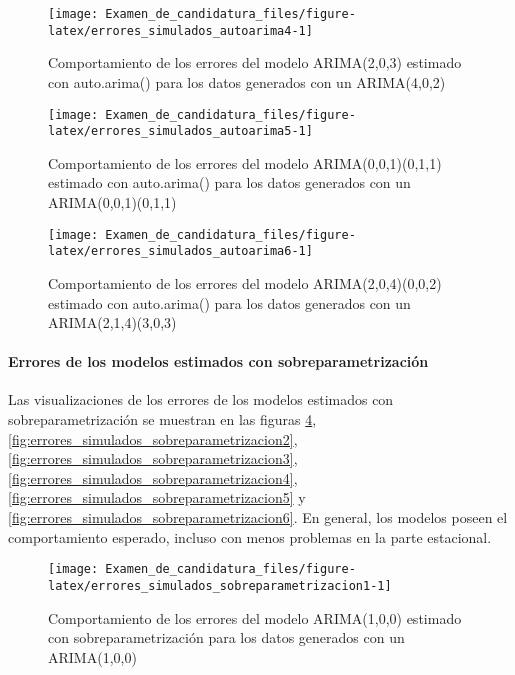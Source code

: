 \documentclass[
]{article}
\begin{document}
\begin{figure}[H]
\texttt{[image: Examen\_de\_candidatura\_files/figure-latex/errores\_simulados\_autoarima4-1]} \caption{Comportamiento de los errores del modelo ARIMA(2,0,3) estimado con auto.arima() para los datos generados con un ARIMA(4,0,2)}\label{fig:errores_simulados_autoarima4}
\end{figure}

\begin{figure}[H]
\texttt{[image: Examen\_de\_candidatura\_files/figure-latex/errores\_simulados\_autoarima5-1]} \caption{Comportamiento de los errores del modelo ARIMA(0,0,1)(0,1,1) estimado con auto.arima() para los datos generados con un ARIMA(0,0,1)(0,1,1)}\label{fig:errores_simulados_autoarima5}
\end{figure}

\begin{figure}[H]
\texttt{[image: Examen\_de\_candidatura\_files/figure-latex/errores\_simulados\_autoarima6-1]} \caption{Comportamiento de los errores del modelo ARIMA(2,0,4)(0,0,2) estimado con auto.arima() para los datos generados con un ARIMA(2,1,4)(3,0,3)}\label{fig:errores_simulados_autoarima6}
\end{figure}

\paragraph{Errores de los modelos estimados con sobreparametrización}

Las visualizaciones de los errores de los modelos estimados con
sobreparametrización se muestran en las figuras
\ref{fig:errores_simulados_sobreparametrizacion1},
\ref{fig:errores_simulados_sobreparametrizacion2},
\ref{fig:errores_simulados_sobreparametrizacion3},
\ref{fig:errores_simulados_sobreparametrizacion4},
\ref{fig:errores_simulados_sobreparametrizacion5} y
\ref{fig:errores_simulados_sobreparametrizacion6}. En general, los
modelos poseen el comportamiento esperado, incluso con menos problemas
en la parte estacional.

\begin{figure}[H]
\texttt{[image: Examen\_de\_candidatura\_files/figure-latex/errores\_simulados\_sobreparametrizacion1-1]} \caption{Comportamiento de los errores del modelo ARIMA(1,0,0) estimado con sobreparametrización para los datos generados con un ARIMA(1,0,0)}\label{fig:errores_simulados_sobreparametrizacion1}
\end{figure}
\end{document}
